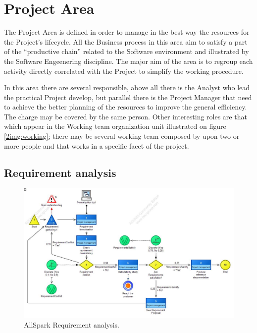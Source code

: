 \section{Project Area}
The Project Area is defined in order to manage in the best way the resources for the Project's lifecycle. All the Business process in this area aim to satisfy a part of the ``productive chain'' related to the Software environment and illustrated by the Software Engeenering discipline. The major aim of the area is to regroup each activity directly correlated with the Project to simplify the working procedure.

In this area there are several responsible, above all there is the Analyst who lead the practical Project develop, but parallel there is the Project Manager that need to achieve the better planning of the resources to improve the general efficiency. The charge may be covered by the same person. Other interesting roles are that which appear in the Working team organization unit illustrated on figure \ref{2img:working}; there may be several working team composed by upon two or more people and that works in a specific facet of the project.


\subsection{Requirement analysis}

\begin{figure}[ht!]
\begin{centering}
\includegraphics[scale=0.50, angle=90]{assign2/adonis/imgs/requirement.jpg}
\caption{AllSpark Requirement analysis.}
\label{2img:requirement}
\end{centering}
\end{figure}


